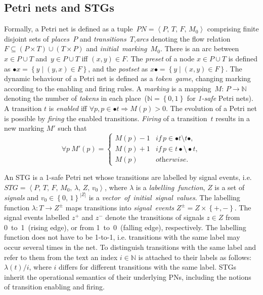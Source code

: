 \documentclass[british, journal]{IEEEtran}
\begin{document}
\vspace{-1mm}
\subsection{Petri nets and STGs}

Formally, a Petri net is defined as a tuple~$PN=\left\langle P,\, T,\, F,\,
M_{0}\right\rangle $
comprising finite disjoint sets of \emph{places~}$P$ and \emph{transitions~}$T$,\emph{arcs} denoting the flow relation~$F\subseteq\left(P\times
T\right)\cup\left(T\times P\right)$
and \emph{initial~marking~}$M_{0}$. There is an arc between~$x\in P\cup T$
and~$y\in P\cup T$ iff $\left(x,y\right)\in F$. The \emph{preset}
of a node $x\in P\cup T$ is defined as $\bullet x=\left\{
y\mid\left(y,x\right)\in F\right\} $,
and the \emph{postset} as $x\bullet=\left\{ y\mid\left(x,y\right)\in F\right\}
$.
The dynamic behaviour of a Petri net is defined as a \emph{token~game},
changing marking according to the enabling and firing rules. A \emph{marking}
is a mapping~$M:\, P\rightarrow\mathbb{N}$ denoting the number of
\emph{tokens} in each place~($\mathbb{N}=\left\{ 0,1\right\} $ for
\emph{1-safe} Petri nets). A transition $t$ is \emph{enabled} iff
$\forall p,p\in\bullet t\Rightarrow M(p)>0$. The evolution of a Petri
net is possible by \emph{firing} the enabled transitions. \emph{Firing}
of a transition~$t$ results in a new marking $M'$ such that
\[
\forall p~M'(p)=\left\{ \begin{array}{ll}
M(p)-1 & \textit{if}\, p\in\bullet t\setminus t\bullet,\\
M(p)+1 & \textit{if}\, p\in t\bullet\setminus\bullet t,\\
M(p)\,\,\,\,\, & \textit{otherwise}.
\end{array}\right.
\]

An STG is a 1-safe Petri net whose transitions are labelled by signal
events, i.e. $STG=\left\langle P,\, T,\, F,\, M_{0},\,\lambda,\, Z,\,
v_{0}\right\rangle $,
where $\lambda$ is a \emph{labelling~function}, $Z$ is a set of
\emph{signals} and $v_{0}\in\left\{ 0,\,1\right\} ^{\left|Z\right|}$
is a \emph{vector~of}~\emph{initial~signal~values}. The labelling
function $\lambda:T\rightarrow Z^{\pm}$ maps transitions into
\emph{signal~events}
$Z^{\pm}=Z\times\left\{+,-\right\}$. The signal events labelled $z^{+}$
and $z^{-}$ denote the transitions of signals $z\in Z$ from 0~to~1~(rising
edge), or from 1~to~0~(falling edge), respectively. The labelling
function does not have to be 1-to-1, i.e. transitions with the same
label may occur several times in the net. To distinguish transitions
with the same label and refer to them from the text an index $i\in\mathbb{N}$
is attached to their labels as follows: $\lambda\left(t\right)/i$,
where $i$ differs for different transitions with the same label.
STGs inherit the operational semantics of their underlying PNs, including
the notions of transition enabling and firing.
\end{document}
